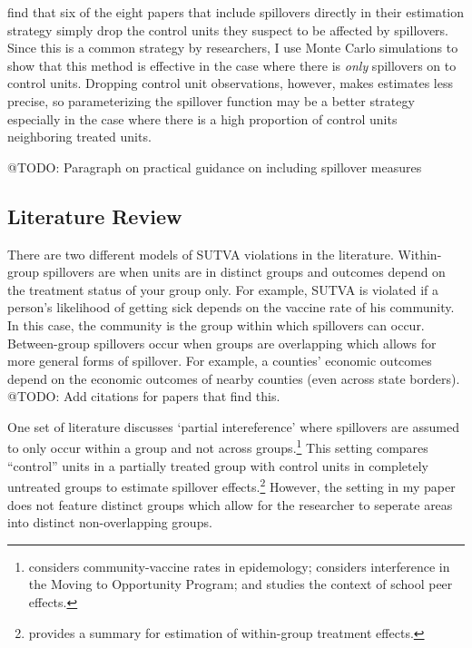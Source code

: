 \documentclass[11pt]{article}
\begin{document}
\citet{Berg_Streitz_2019} find that six of the eight papers that include spillovers directly in their estimation strategy simply drop the control units they suspect to be affected by spillovers. Since this is a common strategy by researchers, I use Monte Carlo simulations to show that this method is effective in the case where there is \textit{only} spillovers on to control units. Dropping control unit observations, however, makes estimates less precise, so parameterizing the spillover function may be a better strategy especially in the case where there is a high proportion of control units neighboring treated units. 

@TODO: Paragraph on practical guidance on including spillover measures

\subsection{Literature Review}

There are two different models of SUTVA violations in the literature. Within-group spillovers are when units are in distinct groups and outcomes depend on the treatment status of your group only. For example, SUTVA is violated if a person's likelihood of getting sick depends on the vaccine rate of his community. In this case, the community is the group within which spillovers can occur. Between-group spillovers occur when groups are overlapping which allows for more general forms of spillover. For example, a counties' economic outcomes depend on the economic outcomes of nearby counties (even across state borders). @TODO: Add citations for papers that find this.

One set of literature discusses `partial intereference' where spillovers are assumed to only occur within a group and not across groups.\footnote{\citet{Halloran_Struchiner_1995} considers community-vaccine rates in epidemology; \citet{Sobel_2006} considers interference in the Moving to Opportunity Program; and \citet{Angrist_2014} studies the context of school peer effects.} This setting compares ``control'' units in a partially treated group with control units in completely untreated groups to estimate spillover effects.\footnote{\citet{Angelucci_DiMaro_2016} provides a summary for estimation of within-group treatment effects.} However, the setting in my paper does not feature distinct groups which allow for the researcher to seperate areas into distinct non-overlapping groups.
\end{document}

